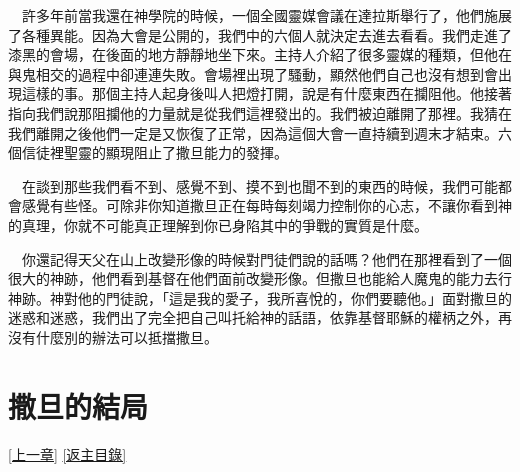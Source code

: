 \documentclass{book}
\begin{document}
　許多年前當我還在神學院的時候，一個全國靈媒會議在達拉斯舉行了，他們施展了各種異能。因為大會是公開的，我們中的六個人就決定去進去看看。我們走進了漆黑的會場，在後面的地方靜靜地坐下來。主持人介紹了很多靈媒的種類，但他在與鬼相交的過程中卻連連失敗。會場裡出現了騷動，顯然他們自己也沒有想到會出現這樣的事。那個主持人起身後叫人把燈打開，說是有什麼東西在攔阻他。他接著指向我們說那阻攔他的力量就是從我們這裡發出的。我們被迫離開了那裡。我猜在我們離開之後他們一定是又恢復了正常，因為這個大會一直持續到週末才結束。六個信徒裡聖靈的顯現阻止了撒旦能力的發揮。

　在談到那些我們看不到、感覺不到、摸不到也聞不到的東西的時候，我們可能都會感覺有些怪。可除非你知道撒旦正在每時每刻竭力控制你的心志，不讓你看到神的真理，你就不可能真正理解到你已身陷其中的爭戰的實質是什麼。

　你還記得天父在山上改變形像的時候對門徒們說的話嗎？他們在那裡看到了一個很大的神跡，他們看到基督在他們面前改變形像。但撒旦也能給人魔鬼的能力去行神跡。神對他的門徒說，「這是我的愛子，我所喜悅的，你們要聽他。」面對撒旦的迷惑和迷惑，我們出了完全把自己叫托給神的話語，依靠基督耶穌的權柄之外，再沒有什麼別的辦法可以抵擋撒旦。

\chapter{撒旦的結局}
\label{sec:ch20}
\hyperref[sec:ch19]{[上一章]}
\hyperlink{toc}{[返主目錄]}

\begin{center}
\noindent{}
\end{center}
\end{document}
